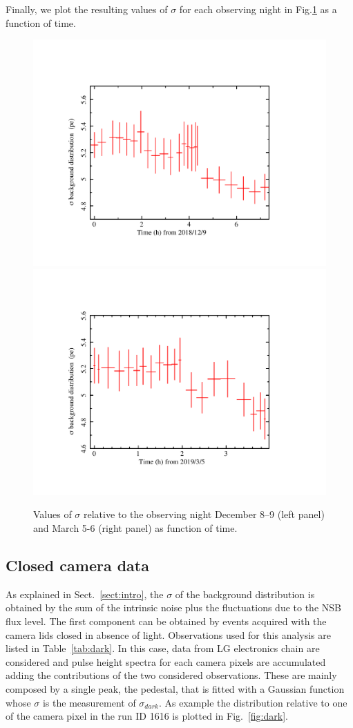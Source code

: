 Finally, we plot the resulting values of $\sigma$ for each observing night in Fig.\ref{fig:sigma}  as a function of time. 

\begin{figure}[ht!!]
\centering
\includegraphics[angle=0, width=.48\textwidth]{Figure/ASTRI_bkg_20181208_20181209.pdf}
\includegraphics[angle=0, width=.48\textwidth]{Figure/ASTRI_bkg_20190305_20190306.pdf}
\vspace{0.5cm}
\caption{Values of $\sigma$ relative to the observing night December 8--9 (left panel) and March 5-6 (right panel) as function of time. }
\label{fig:sigma}
\end{figure}

\subsection{Closed camera data} 

As explained in Sect.~\ref{sect:intro}, the $\sigma$ of the background distribution is obtained by the sum of the intrinsic noise plus the fluctuations due to the NSB flux level. The first component can be obtained by events acquired with the camera lids closed in absence of light.
Observations used for this analysis are listed in Table~\ref{tab:dark}. In this case, data from LG electronics chain are considered and pulse height spectra for each camera pixels are accumulated adding the contributions of the two considered observations. These are mainly composed by a single peak, the pedestal, that is fitted with a Gaussian function whose $\sigma$ is the measurement of $\sigma_{dark}$. As example the distribution relative to one of the camera pixel in the run ID 1616 is plotted in Fig.~\ref{fig:dark}.


